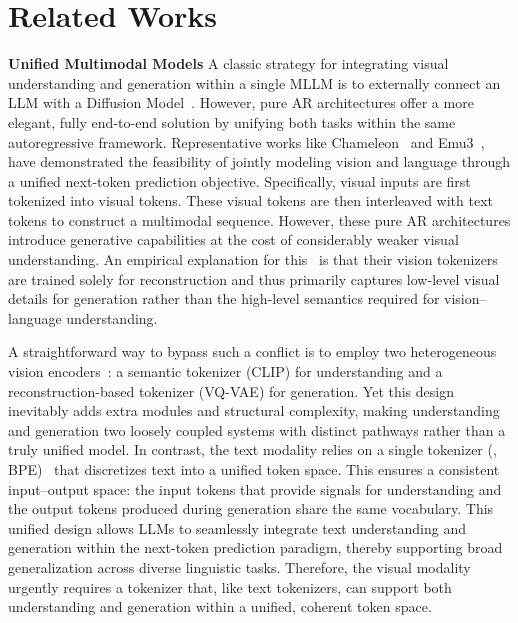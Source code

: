 \section{Related Works}
\label{related}

\textbf{Unified Multimodal Models}\quad
A classic strategy for integrating visual understanding and generation within a single MLLM is to externally connect an LLM with a Diffusion Model~\citep{sun2024Emu2,dong2024dreamllm,metaquery,blip3o}. However, pure AR architectures offer a more elegant, fully end-to-end solution by unifying both tasks within the same autoregressive framework.
Representative works like Chameleon~\citep{yu2023CM3leon,team2024chameleon} and Emu3~\citep{wang2024emu3}, have demonstrated the feasibility of jointly modeling vision and language through a unified next-token prediction objective. Specifically, visual inputs are first tokenized into visual tokens. These visual tokens are then interleaved with text tokens to construct a multimodal sequence.
However, these pure AR architectures introduce generative capabilities at the cost of considerably weaker visual understanding. An empirical explanation for this~\citep{wu2025vilau,xie2025musevl} is that their vision tokenizers are trained solely for reconstruction and thus primarily captures low-level visual details for generation rather than the high-level semantics required for vision–language understanding.

A straightforward way to bypass such a conflict is to employ two heterogeneous vision encoders~\citep{wu2024janus,chen2025januspro,deng2025bagel}: a semantic tokenizer (\eg CLIP) for understanding and a reconstruction-based tokenizer (\eg VQ-VAE) for generation. Yet this design inevitably adds extra modules and structural complexity, making understanding and generation two loosely coupled systems with distinct pathways rather than a truly unified model.
In contrast, the text modality relies on a single tokenizer (\eg, BPE)~\citep{sennrich2015bpe} that discretizes text into a unified token space. This ensures a consistent input–output space: the input tokens that provide signals for understanding and the output tokens produced during generation share the same vocabulary.
This unified design allows LLMs to seamlessly integrate text understanding and generation within the next-token prediction paradigm, thereby supporting broad generalization across diverse linguistic tasks.
Therefore, the visual modality urgently requires a tokenizer that, like text tokenizers, can support both understanding and generation within a unified, coherent token space.

